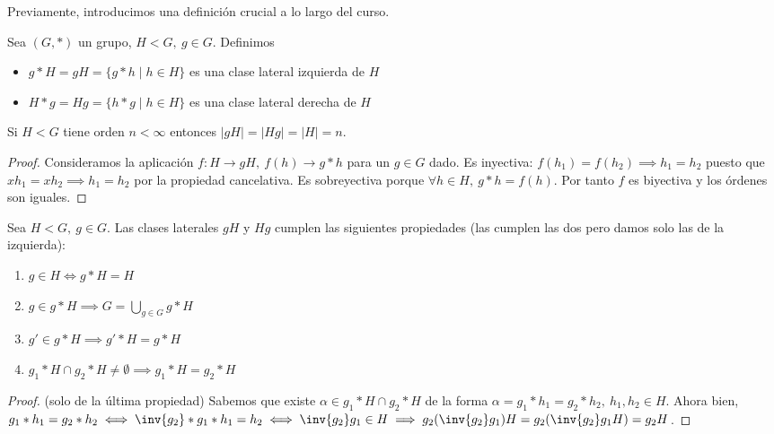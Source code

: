 Previamente, introducimos una definición crucial a lo largo del curso.

\begin{dfn}
	Sea $(G, \ast)$ un grupo, $H < G,\ g \in G$. Definimos
	\begin{itemize}
		\item $g \ast H = gH = \{g \ast h \mid h \in H\}$ es una clase lateral izquierda de $H$
		\item $H \ast g = Hg = \{h \ast g \mid h \in H\}$ es una clase lateral derecha de $H$
	\end{itemize}
\end{dfn}

\begin{thm}
	\label{thm:ordencajaslaterales}
	Si $H < G$ tiene orden $n < \infty$ entonces $|gH| = |Hg| = |H| = n$.
\end{thm}

\begin{proof}
	Consideramos la aplicación $f: H \to gH,\ f(h) \to g\ast h$ para un $g \in G$ dado. Es inyectiva: $f(h_1) = f(h_2) \implies h_1 = h_2$ puesto que $xh_1 = xh_2 \implies h_1 = h_2$ por la propiedad cancelativa. Es sobreyectiva porque $\forall h \in H,\ g \ast h = f(h)$. Por tanto $f$ es biyectiva y los órdenes son iguales.
\end{proof}

\begin{pro}
	Sea $H < G,\ g \in G$. Las clases laterales $gH$ y $Hg$ cumplen las siguientes propiedades (las cumplen las dos pero damos solo las de la izquierda):
	\begin{enumerate}
		\item $g \in H \iff g\ast H = H$
		\item $g \in g \ast H \implies G = \bigcup_{g \in G} g \ast H$
		\item $g' \in g \ast H \implies g' \ast H = g \ast H$
		\item $g_1 \ast H \cap g_2 \ast H \neq \emptyset \implies g_1 \ast H = g_2 \ast H$
	\end{enumerate}
\end{pro}

\begin{proof}
	(solo de la última propiedad)
	Sabemos que existe $\alpha \in g_1 \ast H \cap g_2 \ast H$ de la forma $\alpha = g_1 \ast h_1 = g_2 \ast h_2,\ h_1, h_2 \in H$. Ahora bien, $g_1 \ast h_1 = g_2 \ast h_2 \iff \inv{g_2} \ast g_1 \ast h_1 = h_2 \iff \inv{g_2}g_1 \in H \implies g_2(\inv{g_2}g_1)H = g_2(\inv{g_2}g_1H) = g_2 H$.
\end{proof}

